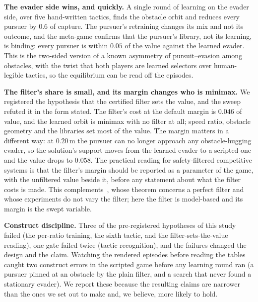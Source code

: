 \documentclass[conference]{IEEEtran}
\begin{document}
\textbf{The evader side wins, and quickly.} A single round of learning on the evader side, over five hand-written tactics, finds the obstacle orbit and reduces every pursuer by $0.6$ of capture. The pursuer's retraining changes its mix and not its outcome, and the meta-game confirms that the pursuer's library, not its learning, is binding: every pursuer is within $0.05$ of the value against the learned evader. This is the two-sided version of a known asymmetry of pursuit--evasion among obstacles, with the twist that both players are learned selectors over human-legible tactics, so the equilibrium can be read off the episodes.

\textbf{The filter's share is small, and its margin changes who is minimax.} We registered the hypothesis that the certified filter sets the value, and the sweep refuted it in the form stated. The filter's cost at the default margin is $0.046$ of value, and the learned orbit is minimax with no filter at all; speed ratio, obstacle geometry and the libraries set most of the value. The margin matters in a different way: at $0.20$\,m the pursuer can no longer approach any obstacle-hugging evader, so the solution's support moves from the learned evader to a scripted one and the value drops to $0.058$. The practical reading for safety-filtered competitive systems is that the filter's margin should be reported as a parameter of the game, with the unfiltered value beside it, before any statement about what the filter costs is made. This complements~\cite{wu2026competence}, whose theorem concerns a perfect filter and whose experiments do not vary the filter; here the filter is model-based and its margin is the swept variable.

\textbf{Construct discipline.} Three of the pre-registered hypotheses of this study failed (the per-ratio training, the sixth tactic, and the filter-sets-the-value reading), one gate failed twice (tactic recognition), and the failures changed the design and the claim. Watching the rendered episodes before reading the tables caught two construct errors in the scripted game before any learning round ran (a pursuer pinned at an obstacle by the plain filter, and a search that never found a stationary evader). We report these because the resulting claims are narrower than the ones we set out to make and, we believe, more likely to hold.
\end{document}
